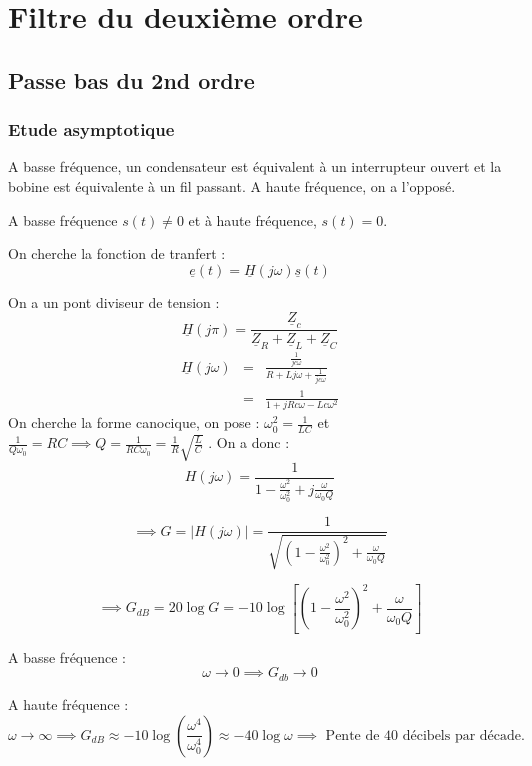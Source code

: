 \section{Filtre du deuxième ordre}
\subsection{Passe bas du 2nd ordre}

\subsubsection{Etude asymptotique}

A basse fréquence, un condensateur est équivalent à un interrupteur ouvert et la bobine est équivalente à un fil passant. A haute fréquence, on a l'opposé. \par
A basse fréquence \(s(t) \neq 0\) et à haute fréquence, \(s(t) = 0\). \par
On cherche la fonction de tranfert  : 
\[
    \underline{e}(t) = \underline{H}(j \omega) \underline{s}(t)
\] 

On a un pont diviseur de tension : 
\[
    \underline{H}(j \pi) = \frac{\underline{Z}_{c}}{\underline{Z}_{R} + \underline{Z}_{L} + \underline{Z}_{C}}
\]
\begin{eqnarray*}
    \underline{H}(j \omega) &=& \frac{\frac{1}{jc \omega}}{R + Lj \omega + \frac{1}{jc \omega}}\\
    &=& \frac{1}{1+jRc \omega - Lc \omega^{2}}
\end{eqnarray*}
On cherche la forme canocique, on pose : \( \omega_{\text{0}}^{2} = \frac{1}{LC}\) et \(\frac{1}{Q\omega_{\text{0}}} = RC \implies Q = \frac{1}{RC \omega_{\text{0}}} = \frac{1}{R}\sqrt{\frac{L}{C}}\) . On a donc : 
\[
    H(j \omega) = \frac{1}{1 - \frac{\omega^{2}}{\omega_{\text{0}}^{2}} + j \frac{\omega}{\omega_{\text{0}}Q}}
\]

\[
    \implies G = \lvert H(j \omega) \rvert = \frac{1}{\sqrt{(1-\frac{\omega^{2}}{\omega_{\text{0}}^{2}})^{2} + \frac{\omega}{\omega_{\text{0}}Q}}} 
\]

\[
    \implies G_{dB} = 20 \log G = -10\log \left[ (1-\frac{\omega^{2}}{\omega_{\text{0}}^{2}})^{2} + \frac{\omega}{\omega_{\text{0}}Q}  \right]
\]

A basse fréquence : 
\[
    \omega \to  0 \implies G_{db} \to 0
\]

A haute fréquence : 
\[
    \omega \to \infty \implies G_{dB} \approx -10 \log \left( \frac{\omega^{4}}{\omega_{\text{0}}^{4}} \right) \approx -40 \log \omega \implies \text{ Pente de 40 décibels par décade. } 
\]

